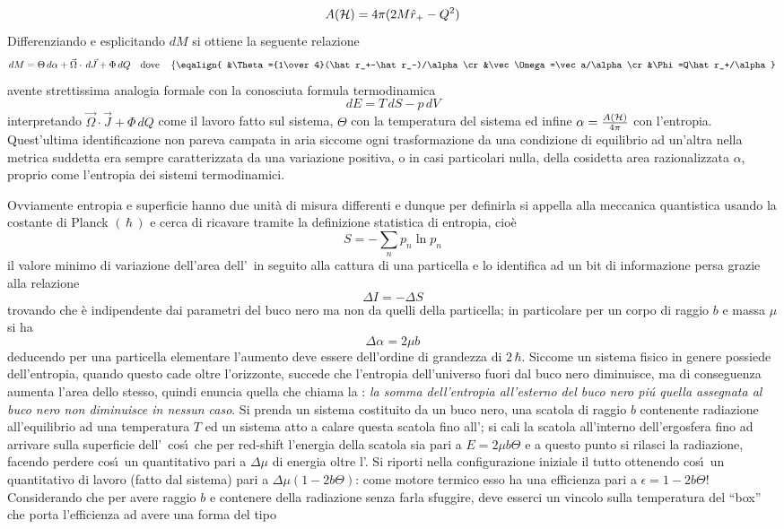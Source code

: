$$
A({\cal H})=4\pi(2M\hat r_+-Q^2)
$$
\noindent Differenziando e esplicitando $dM$ si ottiene la seguente relazione
$$
dM=\Theta\, d\alpha+\vec{\Omega}\cdot\,d\vec{J}+\Phi\, dQ\quad\hbox{dove}\quad\left\{
\eqalign{
&\Theta={1\over4}(\hat r_+-\hat r_-)/\alpha\cr
&\vec\Omega=\vec a/\alpha\cr
&\Phi=Q\hat r_+/\alpha
}\right.
$$
avente strettissima analogia formale con la conosciuta formula termodinamica
$$
dE=T\,dS-p\,dV
$$
interpretando $\vec{\Omega}\cdot\vec{J}+\Phi\, dQ$ come il lavoro fatto sul sistema, $\Theta$ con la temperatura del sistema ed infine $\alpha={A({\cal H})\over 4\pi}$ con l'entropia. Quest'ultima identificazione non pareva campata in aria siccome ogni trasformazione da una condizione di equilibrio ad un'altra nella metrica suddetta era sempre caratterizzata da una variazione positiva, o in casi particolari nulla, della cosidetta area razionalizzata $\alpha$, proprio come l'entropia dei sistemi termodinamici.\par
Ovviamente entropia e superficie hanno due unit\`a di misura differenti e dunque per definirla si appella alla meccanica quantistica usando la costante di Planck $(\,\hbar\,)$ e cerca di ricavare tramite la definizione statistica di entropia, cio\`e
$$
S=-\sum_np_n\ln p_n
$$
il valore minimo di variazione dell'area dell'\Oe\ in seguito alla cattura di una particella e lo identifica ad un bit di informazione persa grazie alla relazione
$$
\Delta I=-\Delta S
$$
trovando che \`e indipendente dai parametri del buco nero ma non da quelli della particella; in particolare per un corpo di raggio $b$ e massa $\mu$ si ha
$$
\Delta \alpha=2\mu b
$$
deducendo per una particella elementare l'aumento deve essere dell'ordine di gran\-dez\-za di $2\,\hbar$. Siccome un sistema fisico in genere possiede dell'entropia, quando questo cade oltre l'orizzonte, succede che l'entropia dell'universo fuori dal buco nero diminuisce, ma di conseguenza aumenta l'area dello stesso, quindi  enuncia quella che chiama la : {\sl la somma dell'entropia all'esterno del buco nero pi\'u quella assegnata al buco nero non diminuisce in nessun caso}.
Si prenda un sistema costituito da un buco nero, una scatola di raggio $b$ contenente radiazione all'equilibrio ad una temperatura $T$ ed un sistema atto a calare questa scatola fino all'\Oe; si cali la scatola all'interno dell'ergosfera fino ad arrivare sulla superficie dell'\Oe\ cos\'\i\ che per  red-shift l'energia della scatola sia pari a $E=2\mu b\Theta$ e  a questo punto si rilasci la radiazione, facendo perdere cos\'\i\ un quantitativo pari a $\Delta\mu$ di energia oltre l'\Oe. Si  riporti nella configurazione iniziale il tutto ottenendo cos\'\i\ un quantitativo di lavoro (fatto dal sistema) pari a $\Delta\mu(1-2b\Theta)$: come motore termico esso ha una efficienza pari a $\epsilon=1-2b\Theta$! Considerando che per avere raggio $b$ e contenere della radiazione senza farla sfuggire, deve esserci un vincolo sulla temperatura del ``box'' che porta l'efficienza ad avere una forma del tipo
